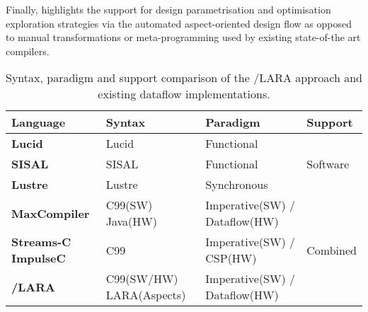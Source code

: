 Finally,  highlights the support for design
parametrisation and optimisation exploration strategies via the
automated aspect-oriented design flow as opposed to manual
transformations or meta-programming used by existing state-of-the art
compilers.


\begin{table}[!ht]
  \renewcommand{\arraystretch}{1.5}
  \centering
  \begin{tabularx}{\textwidth}{X | p{2.5cm} | p{3cm} | p{1.9cm} }
    \hline
    \bf{Language}                 & \bf{Syntax}              & \bf{Paradigm}               & \bf{Support}              \\
    \hline \hline
    \bf{Lucid}                    & Lucid                    & Functional                  & \multirow{3}{*}{Software} \\
    \cline{1-3}
    \bf{SISAL}                    & SISAL                    & Functional                  &                           \\
    \cline{1-3}
    \bf{Lustre}                   & Lustre                   & Synchronous                 &                           \\
    \bf{MaxCompiler}              & C99(SW) Java(HW)         & Imperative(SW) / Dataflow(HW) & \multirow{3}{*}{Combined} \\
    \bf{Streams-C} \bf{ImpulseC}\ & C99                      & Imperative(SW) / CSP(HW)      &                           \\
    \bf{\FAST{}}/\bf{LARA}        & C99(SW/HW) LARA(Aspects) & Imperative(SW) / Dataflow(HW) &                           \\
  \end{tabularx}
  \caption{Syntax, paradigm and support comparison of the \FAST{}/LARA approach and existing dataflow implementations.}
  \label{table:feature-comparison1}
\end{table}


